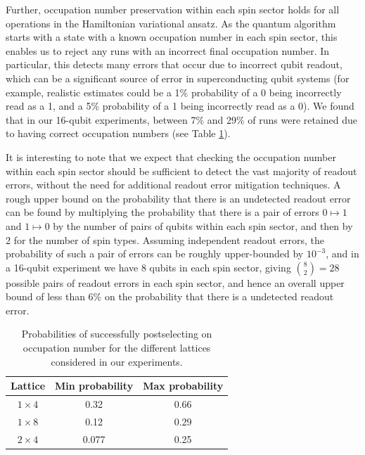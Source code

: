 \documentclass[aps,prb,twoside,superscriptaddress,longbibliography,nofootinbib,floatfix, notitlepage,twocolumn]{revtex4-1}
\begin{document}
Further, occupation number preservation within each spin sector holds for all operations in the Hamiltonian variational ansatz. As the quantum algorithm starts with a state with a known occupation number in each spin sector, this enables us to reject any runs with an incorrect final occupation number. In particular, this detects many errors that occur due to incorrect qubit readout, which can be a significant source of error in superconducting qubit systems (for example, realistic estimates could be a 1\% probability of a 0 being incorrectly read as a 1, and a 5\% probability of a 1 being incorrectly read as a 0). We found that in our 16-qubit experiments, between 7\% and 29\% of runs were retained due to having correct occupation numbers (see Table \ref{tab:postselection}).

It is interesting to note that we expect that checking the occupation number within each spin sector should be sufficient to detect the vast majority of readout errors, without the need for additional readout error mitigation techniques\cite{endo18,kandala17,maciejewski19,chen2019}. A rough upper bound on the probability that there is an undetected readout error can be found by multiplying the probability that there is a pair of errors $0 \mapsto 1$ and $1 \mapsto 0$ by the number of pairs of qubits within each spin sector, and then by 2 for the number of spin types. Assuming independent readout errors, the probability of such a pair of errors can be roughly upper-bounded by $10^{-3}$, and in a 16-qubit experiment we have 8 qubits in each spin sector, giving $\binom{8}{2} = 28$ possible pairs of readout errors in each spin sector, and hence an overall upper bound of less than 6\% on the probability that there is a undetected readout error.

\begin{table}[]
    \centering
    \begin{tabular}{|c|c|c|}
        \hline Lattice & Min probability & Max probability \\
        \hline $1\times 4$ & 0.32 & 0.66 \\
        $1\times 8$ & 0.12 & 0.29 \\
        $2\times 4$ & 0.077 & 0.25\\
         \hline
    \end{tabular}
    \caption{Probabilities of successfully postselecting on occupation number for the different lattices considered in our experiments.}
    \label{tab:postselection}
\end{table}
\end{document}
